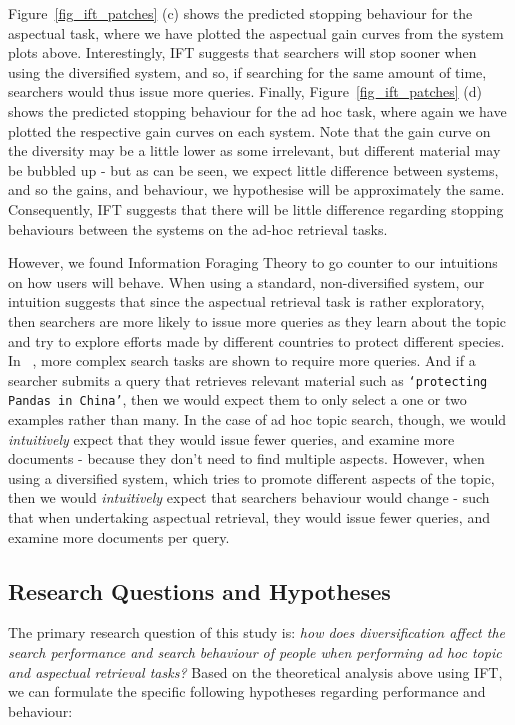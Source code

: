 Figure~\ref{fig_ift_patches} (c) shows the predicted stopping behaviour for the aspectual task, where we have plotted the aspectual gain curves from the system plots above. Interestingly, IFT suggests that searchers will stop sooner when using the diversified system, and so, if searching for the same amount of time, searchers would thus issue more queries. Finally, Figure~\ref{fig_ift_patches} (d) shows the predicted stopping behaviour for the ad hoc task, where again we have plotted the respective gain curves on each system. Note that the gain curve on the diversity may be a little lower as some irrelevant, but different material may be bubbled up - but as can be seen, we expect little difference between systems, and so the gains, and behaviour, we hypothesise will be approximately the same. Consequently, IFT suggests that there will be little difference regarding stopping behaviours between the systems on the ad-hoc retrieval tasks.

However, we found Information Foraging Theory to go counter to our intuitions on how users will behave. 
When using a standard, non-diversified system, our intuition suggests that since the aspectual retrieval task is rather exploratory, then searchers are more likely to issue more queries as they learn about the topic and try to explore efforts made by different countries to protect different species. In ~\cite{kelly2015search_tasks}, more complex search tasks are shown to require more queries. And if a searcher submits a query that retrieves relevant material such as \texttt{`protecting Pandas in China'}, then we would expect them to only select a one or two examples rather than many. In the case of ad hoc topic search, though, we would \emph{intuitively} expect that they would issue fewer queries, and examine more documents - because they don't need to find multiple aspects. However, when using a diversified system, which tries to promote different aspects of the topic, then we would \emph{intuitively} expect that searchers behaviour would change - such that when undertaking aspectual retrieval, they would issue fewer queries, and examine more documents per query. 

\subsection{Research Questions and Hypotheses} \label{sec:questions}
The primary research question of this study is: {\it how does diversification affect the search performance and search behaviour of people when performing ad hoc topic and aspectual retrieval tasks?} Based on the theoretical analysis above using IFT, we can formulate the specific following hypotheses regarding performance and behaviour:

